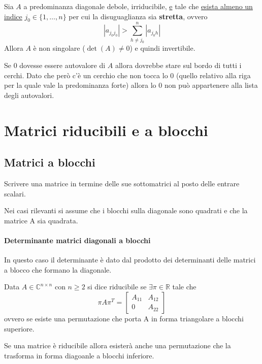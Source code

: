 \documentclass[12pt,a4paper,]{report}
\begin{document}
\begin{teorema}
    \label{th: terzo cor gersh}
    Sia $A$ a predominanza diagonale debole, irriducibile, \uline{e} tale che \uline{esista almeno un indice}
    $j_0\in\{1,\dots,n\}$ per cui la disuguaglianza sia \textbf{stretta}, ovvero
    \[
    |a_{j_0j_0}| > \sum^n_{h\neq j_0}|a_{j_0h}|
    \]
    Allora $A$ è non singolare ($\det(A)\neq 0$) e quindi invertibile.
\end{teorema}
\begin{dimostrazione}
    Se $0$ dovesse essere autovalore di $A$ allora dovrebbe stare sul bordo di tutti i cerchi. Dato che però c'è un cerchio che non tocca lo $0$ (quello relativo alla riga per la quale vale la predominanza forte) allora lo $0$ non può appartenere alla lista degli autovalori.
\end{dimostrazione}

\section{Matrici riducibili e a blocchi}

\subsection{Matrici a blocchi}
Scrivere una matrice in termine delle sue sottomatrici al posto delle entrare scalari.
\begin{nota}
    Nei casi rilevanti si assume che i blocchi sulla diagonale sono quadrati e che la matrice A sia quadrata.
\end{nota}
\paragraph{Determinante matrici diagonali a blocchi}
In questo caso il determinante è dato dal prodotto dei determinanti delle matrici a blocco che formano la diagonale.
\begin{definizione}
    Data $A\in \mathbb{C}^{n\times n}$ con $n\geq2$ si dice riducibile se $\exists \pi \in \mathbb{R}$ tale che
    \[
    \pi A\pi^T = 
    \left[
    \begin{matrix}
        A_{11} & A_{12} \\
        0 & A_{22}
    \end{matrix}
    \right]
    \]
    ovvero se esiste una permutazione che porta A in forma triangolare a blocchi superiore.
\end{definizione}
\begin{nota}
    Se una matrice è riducibile allora esisterà anche una permutazione che la trasforma in forma diagoanle a blocchi inferiore.
\end{nota}
\end{document}
